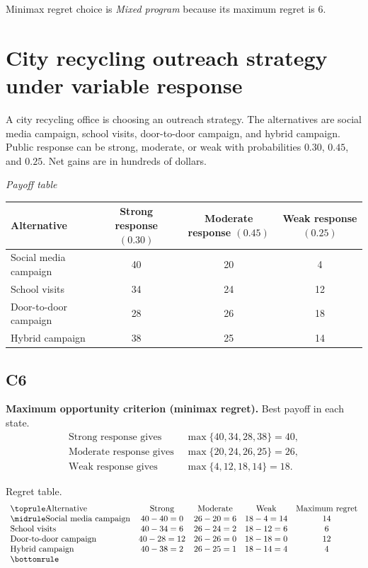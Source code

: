 \begin{ExamProblems}
		Minimax regret choice is \emph{Mixed program} because its maximum regret is $6$.

		\item
		\section{City recycling outreach strategy under variable response}
		A city recycling office is choosing an outreach strategy. The alternatives are social media campaign, school visits, door-to-door campaign, and hybrid campaign. Public response can be strong, moderate, or weak with probabilities $0.30$, $0.45$, and $0.25$. Net gains are in hundreds of dollars.

		\begin{center}
			\textit{Payoff table}\\
			\begin{tabular}{l c c c}
				\toprule
				Alternative & Strong response $(0.30)$ & Moderate response $(0.45)$ & Weak response $(0.25)$ \\
				\midrule
				Social media campaign & 40 & 20 & 4 \\
				School visits & 34 & 24 & 12 \\
				Door-to-door campaign & 28 & 26 & 18 \\
				Hybrid campaign & 38 & 25 & 14 \\
				\bottomrule
			\end{tabular}
		\end{center}

		\subsection*{C6}
		\textbf{Maximum opportunity criterion (minimax regret).} Best payoff in each state.
		\[
		\begin{aligned}
		\text{Strong response gives } &\max\{40,34,28,38\}=40,\\
		\text{Moderate response gives } &\max\{20,24,26,25\}=26,\\
		\text{Weak response gives } &\max\{4,12,18,14\}=18.
		\end{aligned}
		\]

		Regret table.
		\[
		\begin{array}{lcccc}
			\toprule
			\text{Alternative} & \text{Strong} & \text{Moderate} & \text{Weak} & \text{Maximum regret}\\
			\midrule
			\text{Social media campaign} & 40-40=0 & 26-20=6 & 18-4=14 & 14\\
			\text{School visits} & 40-34=6 & 26-24=2 & 18-12=6 & 6\\
			\text{Door-to-door campaign} & 40-28=12 & 26-26=0 & 18-18=0 & 12\\
			\text{Hybrid campaign} & 40-38=2 & 26-25=1 & 18-14=4 & 4\\
			\bottomrule
		\end{array}
		\]


\end{ExamProblems}
